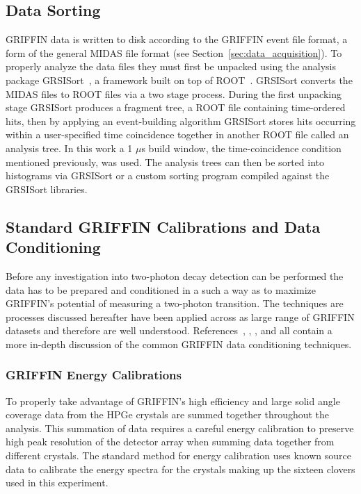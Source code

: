 \documentclass[cnatzke_thesis_proposal.tex]{subfiles}
\begin{document}
\subsection{Data Sorting}
GRIFFIN data is written to disk according to the GRIFFIN event file format, a form of the general MIDAS file format (see Section~\ref{sec:data_acquisition}).
To properly analyze the data files they must first be unpacked using the analysis package GRSISort~\cite{bildstein_griffincollaborationgrsisort_2019}, a framework built on top of ROOT~\cite{brun_root-projectroot_2019}.
GRSISort converts the MIDAS files to ROOT files via a two stage process.
During the first unpacking stage GRSISort produces a fragment tree, a ROOT file containing time-ordered hits, then by applying an event-building algorithm GRSISort stores hits occurring within a user-specified time coincidence together in another ROOT file called an analysis tree.
In this work a 1 $\mu$s build window, the time-coincidence condition mentioned previously, was used.
The analysis trees can then be sorted into histograms via GRSISort or a custom sorting program compiled against the GRSISort libraries.

\subsection{Standard GRIFFIN Calibrations and Data Conditioning}
Before any investigation into two-photon decay detection can be performed the data has to be prepared and conditioned in a such a way as to maximize GRIFFIN's potential of measuring a two-photon transition. 
The techniques are processes discussed hereafter have been applied across as large range of GRIFFIN datasets and therefore are well understood. 
References~\cite{smith_gamma-gamma_2019}, \cite{garcia_absence_2020}, \cite{maclean_spectroscopy_2021}, and \cite{porzio_configuration_2021} all contain a more in-depth discussion of the common GRIFFIN data conditioning techniques.

\subsubsection{GRIFFIN Energy Calibrations}
To properly take advantage of GRIFFIN's high efficiency and large solid angle coverage data from the HPGe crystals are summed together throughout the analysis.
This summation of data requires a careful energy calibration to preserve high peak resolution of the detector array when summing data together from different crystals. 
The standard method for energy calibration uses known source data to calibrate the energy spectra for the crystals making up the sixteen clovers used in this experiment. 
\end{document}
